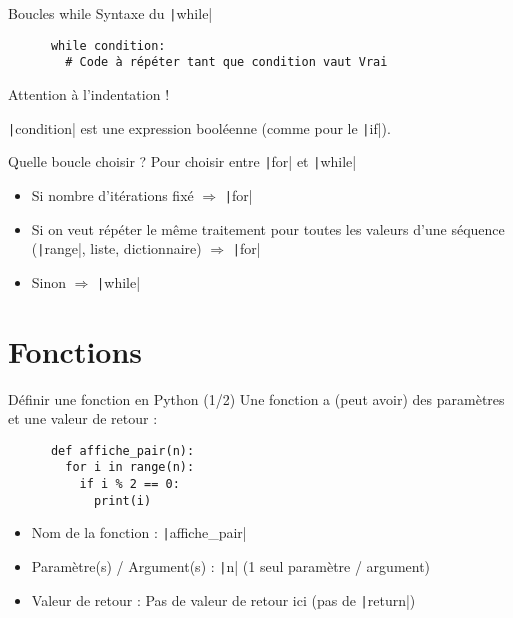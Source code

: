 \documentclass[10pt]{beamer}
\begin{document}
\begin{frame}[fragile]{Boucles while}  
  Syntaxe du \texttt|while|
  \begin{beamercodeblock}
    \begin{verbatim}
      while condition:
        # Code à répéter tant que condition vaut Vrai
    \end{verbatim}
  \end{beamercodeblock}
  Attention à \alert{l'indentation} !

  \texttt|condition| est une expression booléenne (comme pour le \texttt|if|).
\end{frame}

\begin{frame}[fragile]{Quelle boucle choisir ?}  
  Pour choisir entre  \texttt|for| et \texttt|while|
  
  \begin{itemize}
    \item Si nombre d'itérations fixé $\Rightarrow$ \texttt|for|
    \item Si on veut répéter le même traitement pour toutes les valeurs d'une séquence (\texttt|range|, liste, dictionnaire) $\Rightarrow$ \texttt|for|
    \item Sinon $\Rightarrow$ \texttt|while|
  \end{itemize}
\end{frame}

\section{Fonctions}

\begin{frame}[fragile]{Définir une fonction en Python (1/2)}  
  Une fonction a (peut avoir) des paramètres et une valeur de retour :
    
    \begin{beamercodeblock}
      \begin{verbatim}
      def affiche_pair(n):
        for i in range(n):
          if i % 2 == 0:
            print(i)
      \end{verbatim}
    \end{beamercodeblock}

  \begin{itemize}
    \item Nom de la fonction : \texttt|affiche_pair|
    \item Paramètre(s) / Argument(s) : \texttt|n| (1 seul paramètre / argument)
    \item Valeur de retour : Pas de valeur de retour ici (pas de \texttt|return|)
  \end{itemize}
\end{frame} 
\end{document}

